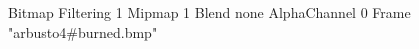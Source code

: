 {Bitmap
	{Filtering 1}
	{Mipmap 1}
	{Blend none}
	{AlphaChannel 0}
	{Frame "arbusto4#burned.bmp"}
}
